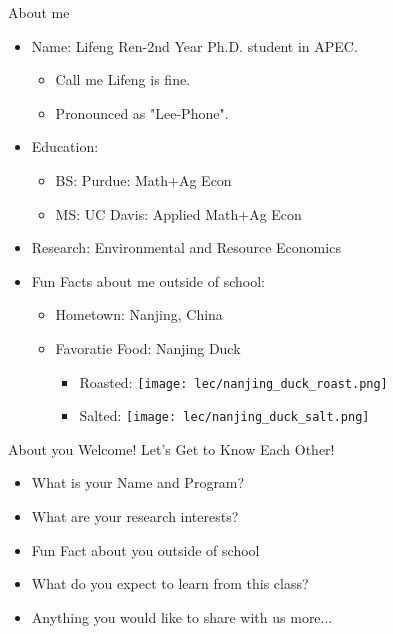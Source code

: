 

\begin{frame}{About me}
    \begin{itemize}
        \item Name: Lifeng Ren-2nd Year Ph.D. student in APEC.
        \begin{itemize}
            \item Call me Lifeng is fine. 
            \item Pronounced as "Lee-Phone".
        \end{itemize} 
        \item Education: 
        \begin{itemize}
            \item BS: Purdue: Math+Ag Econ
            \item MS: UC Davis: Applied Math+Ag Econ
        \end{itemize}
        \item Research: Environmental and Resource Economics
        \item Fun Facts about me outside of school: 
        
        \begin{itemize}
            \item Hometown: Nanjing, China 
            \item Favoratie Food: Nanjing Duck
            \begin{itemize}
                \item Roasted: \texttt{[image: lec/nanjing\_duck\_roast.png]}
                \item Salted: \texttt{[image: lec/nanjing\_duck\_salt.png]}
            \end{itemize}
            
            
        \end{itemize}
        
    \end{itemize}
\end{frame}

\begin{frame}{About you}
Welcome! Let's Get to Know Each Other!
    \begin{itemize}
        \item What is your Name and Program?
        \item What are your research interests? 
        \item Fun Fact about you outside of school
        \item What do you expect to learn from this class? 
        \item Anything you would like to share with us more... 
    \end{itemize}
\end{frame}

